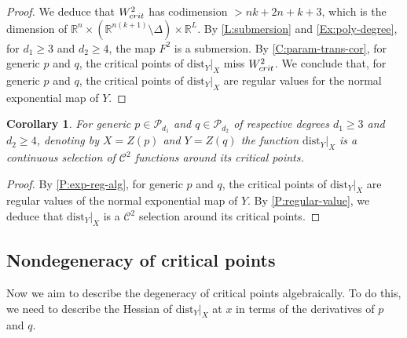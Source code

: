 \documentclass{amsart}
\newcommand{\R}{\mathbb{R}}
\newcommand{\dist}{{\mathrm{dist}_Y|_X}}
\newcommand{\Poly}{\mathscr{P}}
\newtheorem{corollary}[subsubsection]{Corollary}
\theoremstyle{definition}
\theoremstyle{remark}
\begin{document}
\begin{proof}
We deduce that $W^2_{\textnormal{crit}}$ has codimension $> nk + 2n + k + 3$, which is the dimension of $\R^n \times (\R^{n(k + 1)} \setminus \Delta) \times \R^L$. 
By \cref{L:submersion} and \cref{Ex:poly-degree}, for $d_1 \geq 3$ and $d_2 \geq 4$, the map $F^2$ is a submersion.
By \cref{C:param-trans-cor}, for generic $p$ and $q$, the critical points of $\dist$ miss $W^2_{\textnormal{crit}}$. We conclude that, for generic $p$ and $q$, the critical points of $\dist$ are regular values for the normal exponential map of $Y$.
\end{proof}

\begin{corollary}
\label{C:C2selection}
For generic $p\in \Poly_{d_1}$ and $q\in \Poly_{d_2}$ of respective degrees $d_1 \geq 3$ and $d_2\geq 4$, denoting by $X=Z(p)$ and $Y=Z(q)$ the function $\dist$ is a continuous selection of $\mathcal{C}^2$ functions around its critical points.
\end{corollary}

\begin{proof}
By \cref{P:exp-reg-alg}, for generic $p$ and $q$, the critical points of $\dist$ are regular values of the normal exponential map of $Y$. By \cref{P:regular-value}, we deduce that $\dist$ is a $\mathcal{C}^2$ selection around its critical points.
\end{proof}


\subsection{Nondegeneracy of critical points}

Now we aim to describe the degeneracy of critical points algebraically. To do this, we need to describe the Hessian of $\dist$ at $x$ in terms of the derivatives of $p$ and $q$. 
\end{document}
